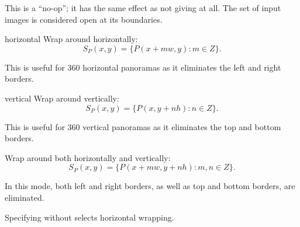 \begin{codelist}
  \begin{codelist}
  \item[\itempar{none \\ open}]\itemend
    This is a ``no-op''; it has the same effect as not giving  at all.  The set
    of input images is considered open at its boundaries.

  \item[horizontal]\itemend
    Wrap around horizontally:
    \[
    S_P(x, y) = \{P(x + m w, y): m \in Z\}.
    \]

    This is useful for %
    360\angulardegree{} horizontal panoramas as it eliminates the left and right borders.

  \item[vertical]\itemend
    Wrap around vertically:
    \[
    S_P(x, y) = \{P(x, y + n h): n \in Z\}.
    \]

    This is useful for 360\angulardegree{}%
    vertical panoramas as it eliminates the top and bottom borders.

  \item[\itempar{both \\ horizontal+vertical
      \\ vertical+horizontal}]\itemend
    Wrap around both horizontally and vertically:
    \[
    S_P(x, y) = \{P(x + m w, y + n h): m, n \in Z\}.
    \]

    In this mode, both left and right borders, as well as top and bottom borders, are
    eliminated.
  \end{codelist}

  Specifying  without  selects horizontal
  wrapping.
\end{codelist}



